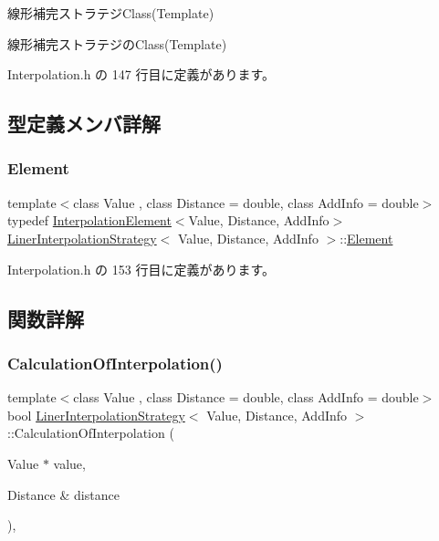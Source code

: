 線形補完ストラテジ\+Class(\+Template) 

線形補完ストラテジの\+Class(\+Template) 

 Interpolation.\+h の 147 行目に定義があります。



\subsection{型定義メンバ詳解}
\mbox{\label{class_liner_interpolation_strategy_acbc8878179146c4a0f3ab0eb75c9d229}} 
\subsubsection{\texorpdfstring{Element}{Element}}
{\footnotesize\ttfamily template$<$class Value , class Distance  = double, class Add\+Info  = double$>$ \\
typedef \mbox{\hyperlink{class_interpolation_element}{Interpolation\+Element}}$<$Value, Distance, Add\+Info$>$ \mbox{\hyperlink{class_liner_interpolation_strategy}{Liner\+Interpolation\+Strategy}}$<$ Value, Distance, Add\+Info $>$\+::\mbox{\hyperlink{class_liner_interpolation_strategy_acbc8878179146c4a0f3ab0eb75c9d229}{Element}}}



 Interpolation.\+h の 153 行目に定義があります。



\subsection{関数詳解}
\mbox{\label{class_liner_interpolation_strategy_a2474fcce1fb2eed6f9bdd8c95582d2b2}} 
\subsubsection{\texorpdfstring{Calculation\+Of\+Interpolation()}{CalculationOfInterpolation()}}
{\footnotesize\ttfamily template$<$class Value , class Distance  = double, class Add\+Info  = double$>$ \\
bool \mbox{\hyperlink{class_liner_interpolation_strategy}{Liner\+Interpolation\+Strategy}}$<$ Value, Distance, Add\+Info $>$\+::Calculation\+Of\+Interpolation (\begin{DoxyParamCaption}\item[{Value $\ast$}]{value,  }\item[{Distance \&}]{distance }\end{DoxyParamCaption})\hspace{0.3cm}{\ttfamily [inline]}, {\ttfamily [virtual]}}



